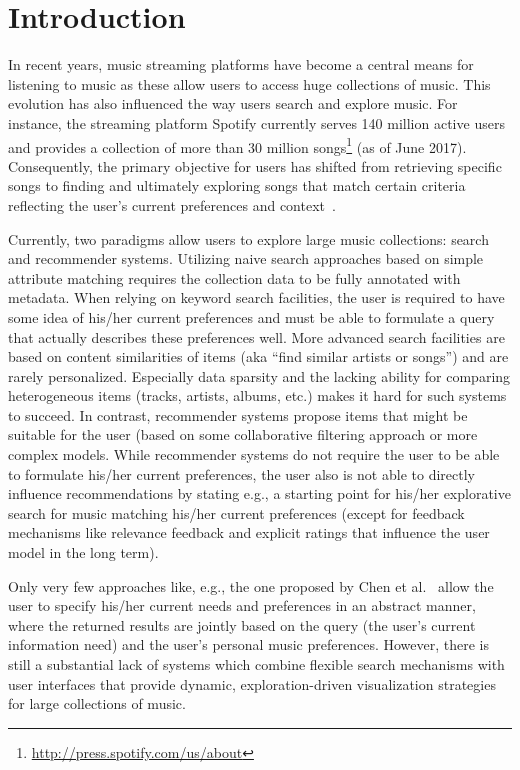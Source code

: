 \documentclass[sigconf]{acmart}
\begin{document}

\maketitle

\section{Introduction}
In recent years, music streaming platforms have become a central means for listening to music as these allow users to access huge collections of music. This evolution has also influenced the way users search and explore music. For instance, the streaming platform Spotify currently serves 140 million active users and provides a collection of more than 30 million songs\footnote{\url{http://press.spotify.com/us/about}} (as of June 2017). Consequently, the primary objective for users has shifted from retrieving specific songs to finding and ultimately exploring songs that match certain criteria reflecting the user's current preferences and context~\cite{lee2016look,kamalzadeh2012survey}. 

Currently, two paradigms allow users to explore large music collections: search and recommender systems. Utilizing naive search approaches based on simple attribute matching requires the collection data to be fully annotated with metadata. When relying on keyword search facilities, the user is required to have some idea of his/her current preferences and must be able to formulate a query that actually describes these preferences well. More advanced search facilities are based on content similarities of items (aka ``find similar artists or songs'') and are rarely personalized. Especially data sparsity and the lacking ability for comparing heterogeneous items (tracks, artists, albums, etc.) makes it hard for such systems to succeed. In contrast, recommender systems propose items that might be suitable for the user (based on some collaborative filtering approach or more complex models. While recommender systems do not require the user to be able to formulate his/her current preferences, the user also is not able to directly influence recommendations by stating e.g., a starting point for his/her explorative search for music matching his/her current preferences (except for feedback mechanisms like relevance feedback and explicit ratings that influence the user model in the long term).

Only very few approaches like, e.g., the one proposed by Chen et al.~\cite{Chen:2016:QMR:2959100.2959169} allow the user to specify his/her current needs and preferences in an abstract manner, where the returned results are jointly based on the query (the user's current information need) and the user's personal music preferences. However, there is still a substantial lack of systems which combine flexible search mechanisms with user interfaces that provide dynamic, exploration-driven visualization strategies for large collections of music. 
\end{document}
